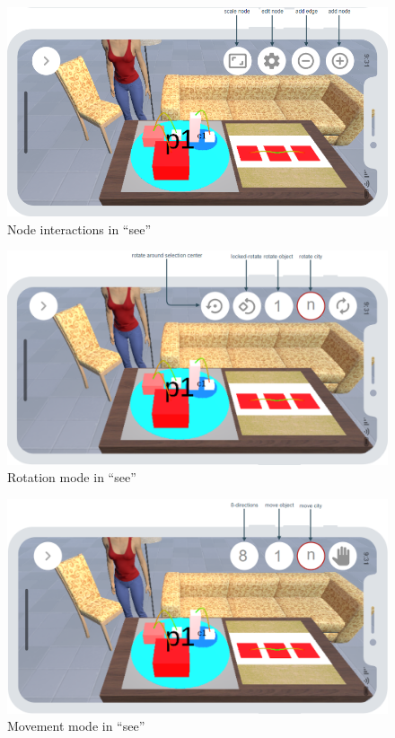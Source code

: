 \begin{figure}[htb]
    \centering
    \includegraphics[width=1\textwidth]{Concept/img/menu3.png}
    \caption{Node interactions in \enquote{\gls{see}}}\label{fig:nodes}
\end{figure}

\begin{figure}[htb]
    \centering
    \includegraphics[width=1\textwidth]{Concept/img/menu4.png}
    \caption{Rotation mode in \enquote{\gls{see}}}\label{fig:rotate}
\end{figure}

\begin{figure}[htb]
    \centering
    \includegraphics[width=1\textwidth]{Concept/img/menu5.png}
    \caption{Movement mode in \enquote{\gls{see}}}\label{fig:move}
\end{figure}

